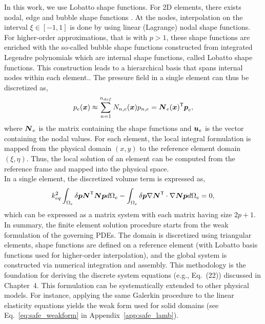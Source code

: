 In this work, we use Lobatto shape functions. For 2D elements, there exists nodal, edge and bubble shape functions \cite{solin2004,sanghavi2021}. At the nodes, interpolation on the interval \( \xi \in [-1, 1] \) is done by using linear (Lagrange) nodal shape functions. For higher-order approximations, that is with $p > 1$, these shape functions are enriched with the so-called bubble shape functions constructed from integrated Legendre polynomials which are internal shape functions, called Lobatto shape functions. This construction leads to a hierarchical basis that spans internal nodes within each element.\cite{beriot2016}. The pressure field in a single element can thus be discretized as,
\begin{equation}
    p_e(\boldsymbol x) \approx \sum_{n=1}^{n_{dof}} N_{n,e}(\boldsymbol x) p_{n,e} = \boldsymbol N_e(\boldsymbol x)^\mathsf T \boldsymbol p_e,
\end{equation}
where $\boldsymbol N_e$ is the matrix containing the shape functions and $\boldsymbol u_e$ is the vector containing the nodal values. For each element, the local integral formulation is mapped from the physical domain $(x, y)$ to the reference element domain $(\xi, \eta)$. Thus, the local solution of an element can be computed from the reference frame and mapped into the physical space. \\

In a single element, the discretized volume term is expressed as,
\begin{equation}
    k_{eq}^2 \int_{\Omega_e} \delta \boldsymbol p \boldsymbol N^\mathsf T \boldsymbol N \boldsymbol p d\Omega_e - \int_{\Omega_e} \delta \boldsymbol p \nabla \boldsymbol N^\mathsf T \cdot \nabla \boldsymbol N \boldsymbol p d\Omega_e = 0, 
\end{equation}
which can be expressed as a matrix system with each matrix having size $2p+1$.
In summary, the finite element solution procedure starts from the weak formulation of the governing PDEs. The domain is discretized using triangular elements, shape functions are defined on a reference element (with Lobatto basis functions used for higher-order interpolation), and the global system is constructed via numerical integration and assembly. This methodology is the foundation for deriving the discrete system equations (e.g., Eq.~(22)) discussed in Chapter~4. This formulation can be systematically extended to other physical models. For instance, applying the same Galerkin procedure to the linear elasticity equations yields the weak form used for solid domains (see Eq.~\ref{eq:safe_weakform} in Appendix~\ref{app:safe_lamb}). \\

